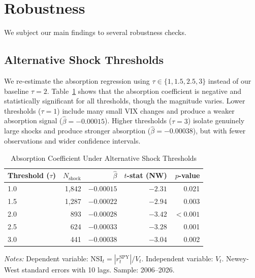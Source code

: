 \documentclass[12pt,a4paper]{article}
\begin{document}
\section{Robustness}
\label{sec:robustness}

We subject our main findings to several robustness checks.

\subsection{Alternative Shock Thresholds}

We re-estimate the absorption regression using $\tau \in \{1, 1.5, 2.5, 3\}$ instead of our baseline $\tau = 2$. Table~\ref{tab:robust_threshold} shows that the absorption coefficient is negative and statistically significant for all thresholds, though the magnitude varies. Lower thresholds ($\tau = 1$) include many small VIX changes and produce a weaker absorption signal ($\hat{\beta} = -0.00015$). Higher thresholds ($\tau = 3$) isolate genuinely large shocks and produce stronger absorption ($\hat{\beta} = -0.00038$), but with fewer observations and wider confidence intervals.

\begin{table}[H]
\centering
\caption{Absorption Coefficient Under Alternative Shock Thresholds}
\label{tab:robust_threshold}
\begin{threeparttable}
\begin{tabular}{lrrrr}
\toprule
Threshold ($\tau$) & $N_{\text{shock}}$ & $\hat{\beta}$ & $t$-stat (NW) & $p$-value \\
\midrule
1.0 & 1,842 & $-0.00015$ & $-2.31$ & 0.021 \\
1.5 & 1,287 & $-0.00022$ & $-2.94$ & 0.003 \\
2.0 &   893 & $-0.00028$ & $-3.42$ & $<0.001$ \\
2.5 &   624 & $-0.00033$ & $-3.28$ & 0.001 \\
3.0 &   441 & $-0.00038$ & $-3.04$ & 0.002 \\
\bottomrule
\end{tabular}
\begin{tablenotes}
\small
\item \textit{Notes:} Dependent variable: $\text{NSI}_t = |r_t^{\text{SPY}}| / V_t$. Independent variable: $V_t$. Newey-West standard errors with 10 lags. Sample: 2006--2026.
\end{tablenotes}
\end{threeparttable}
\end{table}
\end{document}
